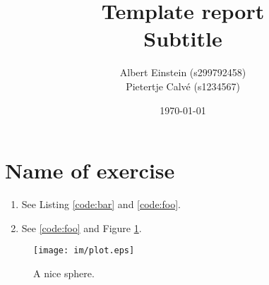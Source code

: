 \documentclass{article}
\title{Template report \\ {\Large Subtitle}}
\date{\today}
\author{
  Albert Einstein (s299792458) \\ 
  Pietertje Calv\'e (s1234567)
}
\begin{document}
\maketitle
\section{Name of exercise}

\begin{enumerate}
 \item See Listing \ref{code:bar} and \ref{code:foo}.
 \item See \ref{code:foo} and Figure \ref{fig:sphere}.
\end{enumerate}

\begin{figure}
 \centering
 \texttt{[image: im/plot.eps]}
 \caption{A nice sphere.}
 \label{fig:sphere}
\end{figure}




\end{document}
